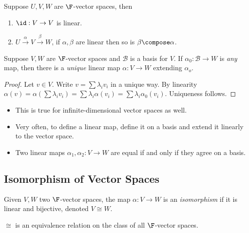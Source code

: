 \documentclass[a4paper]{article}
\newcommand*{\basis}{\mathcal}
\theoremstyle{definition}
\begin{document}
\begin{note}
  Suppose \(U, V, W\) are \(\F\)-vector spaces, then
  \begin{enumerate}
  \item \(\id: V\to V\) is linear.
  \item \(U \stackrel{\alpha}{\to} V \stackrel{\beta}{\to} W\), if \(\alpha, \beta\) are linear then so is \(\beta \compose \alpha\).
  \end{enumerate}
\end{note}

\begin{lemma}
  Suppose \(V, W\) are \(\F\)-vector spaces and \(\basis B\) is a basis for \(V\). If \(\alpha_0: \basis B\to W\) is \emph{any} map, then there is a \emph{unique} linear map \(\alpha: V\to W\) extending \(\alpha_o\).
\end{lemma}

\begin{proof}
  Let \(v\in V\). Write \(v = \sum \lambda_iv_i\) in a unique way. By linearity \(\alpha(v) = \alpha(\sum \lambda_iv_i) = \sum \lambda_i \alpha(v_i) = \sum \lambda_i \alpha_0(v_i)\). Uniqueness follows.
\end{proof}

\begin{note}\leavevmode
  \begin{itemize}
  \item This is true for infinite-dimensional vector spaces as well.
  \item Very often, to define a linear map, define it on a basis and extend it linearly to the vector space.
  \item Two linear maps \(\alpha_1,\alpha_2: V\to W\) are equal if and only if they agree on a basis.
  \end{itemize}
\end{note}

\subsection{Isomorphism of Vector Spaces}

\begin{definition}[Isomorphism]
  Given \(V, W\) two \(\F\)-vector spaces, the map \(\alpha:V\to W\) is an \emph{isomorphism} if it is linear and bijective, denoted \(V \cong W\).
\end{definition}

\begin{lemma}
  \(\cong\) is an equivalence relation on the class of all \(\F\)-vector spaces.
\end{lemma}
\end{document}
